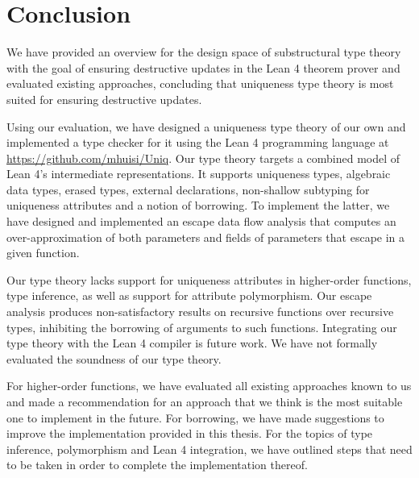 \chapter{Conclusion}\label{sec:conclusion}
We have provided an overview for the design space of substructural type theory with the goal of ensuring destructive updates in the Lean 4 theorem prover and evaluated existing approaches, concluding that uniqueness type theory is most suited for ensuring destructive updates. 

Using our evaluation, we have designed a uniqueness type theory of our own and implemented a type checker for it using the Lean 4 programming language at \url{https://github.com/mhuisi/Uniq}. Our type theory targets a combined model of Lean 4's intermediate representations. It supports uniqueness types, algebraic data types, erased types, external declarations, non-shallow subtyping for uniqueness attributes and a notion of borrowing. To implement the latter, we have designed and implemented an escape data flow analysis that computes an over-approximation of both parameters and fields of parameters that escape in a given function.

Our type theory lacks support for uniqueness attributes in higher-order functions, type inference, as well as support for attribute polymorphism. Our escape analysis produces non-satisfactory results on recursive functions over recursive types, inhibiting the borrowing of arguments to such functions. Integrating our type theory with the Lean 4 compiler is future work. We have not formally evaluated the soundness of our type theory.

For higher-order functions, we have evaluated all existing approaches known to us and made a recommendation for an approach that we think is the most suitable one to implement in the future. For borrowing, we have made suggestions to improve the implementation provided in this thesis. For the topics of type inference, polymorphism and Lean 4 integration, we have outlined steps that need to be taken in order to complete the implementation thereof.